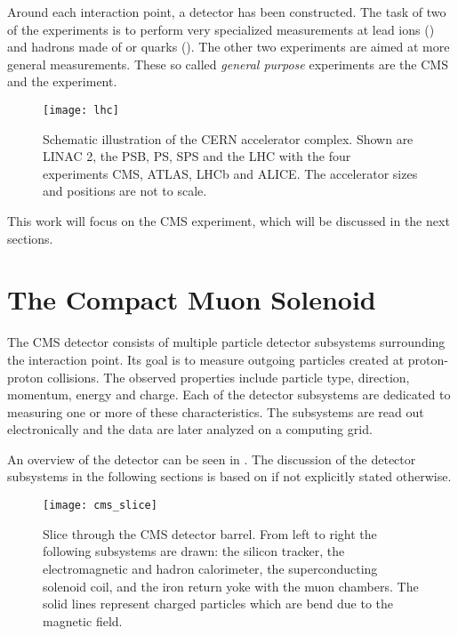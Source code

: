Around each interaction point, a detector has been constructed. The task of two of the experiments is to perform very specialized measurements at lead ions () and hadrons made of \Pcharm or \Pbottom quarks (). 
The other two experiments are aimed at more general measurements. These so called \emph{general purpose} experiments are the \ac{CMS} and the  experiment\cite{Evans:LHCMachine}. 

\begin{figure}
    \centering
    \texttt{[image: lhc]}
    \caption{Schematic illustration of the \ac{CERN} accelerator complex. Shown are \ac{LINAC} 2, the \ac{PSB}, \ac{PS}, \ac{SPS} and the LHC with the four experiments \ac{CMS}, \ac{ATLAS}, \ac{LHCb} and \ac{ALICE}. The accelerator sizes and positions are not to scale\cite{Ley:CERNAccelerators,Caron:LHCLayout
    ,DeMelis:CERNacceleratorcomplex}.}
    \label{figure:LHC}
\end{figure}

This work will focus on the CMS experiment, which will be discussed in the next sections.


\section{The Compact Muon Solenoid}
The \ac{CMS} detector consists of multiple particle detector subsystems surrounding the interaction point.
Its goal is to measure outgoing particles created at proton-proton collisions.
The observed properties include particle type, direction, momentum, energy and charge. Each of the detector subsystems are dedicated to measuring one or more of these characteristics. The subsystems are read out electronically and the data are later analyzed on a computing grid.

An overview of the detector can be seen in . The discussion of the detector subsystems in the following sections is based on \cite{Chatrchyan:CMSexperimentCERN} if not explicitly stated otherwise.

\begin{figure}
    \centering
    \hspace{0.02\textwidth}
    \texttt{[image: cms\_slice]}
    \caption{Slice through the CMS detector barrel. From left to right the following subsystems are drawn: the silicon tracker, the electromagnetic and hadron calorimeter, the superconducting solenoid coil, and the iron return yoke with the muon chambers. The solid lines represent charged particles which are bend due to the magnetic field\cite[modified]{Davis:CMSSlice}.}
    \label{fig:CMS_slice}
\end{figure}

